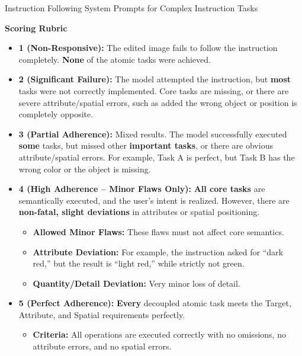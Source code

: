 \documentclass{llmxive}
\begin{document}
\begin{promptbox}[label={System Prompts: IF_Complex_Instruction}]{Instruction Following System Prompts for Complex Instruction Tasks}
\medskip

\textbf{Scoring Rubric}

\begin{itemize}[leftmargin=2.2em, labelsep=0.4em, itemsep=2pt]
    \item \textbf{1 (Non-Responsive):} The edited image fails to follow the instruction completely. \textbf{None} of the atomic tasks were achieved.
    
    \item \textbf{2 (Significant Failure):} The model attempted the instruction, but \textbf{most} tasks were not correctly implemented. Core tasks are missing, or there are severe attribute/spatial errors, such as added the wrong object or position is completely opposite.
    
    \item \textbf{3 (Partial Adherence):} Mixed results. The model successfully executed \textbf{some} tasks, but missed other \textbf{important tasks}, or there are obvious attribute/spatial errors. For example, Task A is perfect, but Task B has the wrong color or the object is missing.
    
    \item \textbf{4 (High Adherence -- Minor Flaws Only):} \textbf{All core tasks} are semantically executed, and the user's intent is realized. However, there are \textbf{non-fatal, slight deviations} in attributes or spatial positioning.
    
    \begin{itemize}
        \item \textbf{Allowed Minor Flaws:} These flaws must not affect core semantics.
        
        \item \textbf{Attribute Deviation:} For example, the instruction asked for ``dark red,'' but the result is ``light red,'' while strictly not green.
        
        \item \textbf{Quantity/Detail Deviation:} Very minor loss of detail.
    \end{itemize}
    
    \item \textbf{5 (Perfect Adherence):} \textbf{Every} decoupled atomic task meets the Target, Attribute, and Spatial requirements perfectly.
    
    \begin{itemize}
        \item \textbf{Criteria:} All operations are executed correctly with no omissions, no attribute errors, and no spatial errors.
    \end{itemize}
\end{itemize}


\end{promptbox}
\end{document}
